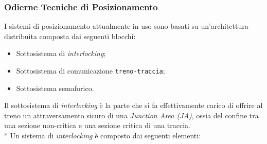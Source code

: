 \subsubsection{Odierne Tecniche di Posizionamento}
I sistemi di posizionamento attualmente in uso sono basati su un'architettura distribuita composta dai seguenti blocchi:
\begin{itemize}
	\item Sottosistema di \emph{interlocking};
	\item Sottosistema di comunicazione \texttt{treno-traccia};
	\item Sottosistema semaforico.
\end{itemize}
Il sottosistema di \emph{interlocking} \`e la parte che si fa effettivamente carico di offrire al treno un attraversamento sicuro di una \emph{Junction Area (JA)}, ossia del confine tra una sezione non-critica e una sezione critica di una traccia.\\*
Un sistema di \emph{interlocking} \`e composto dai seguenti elementi:
